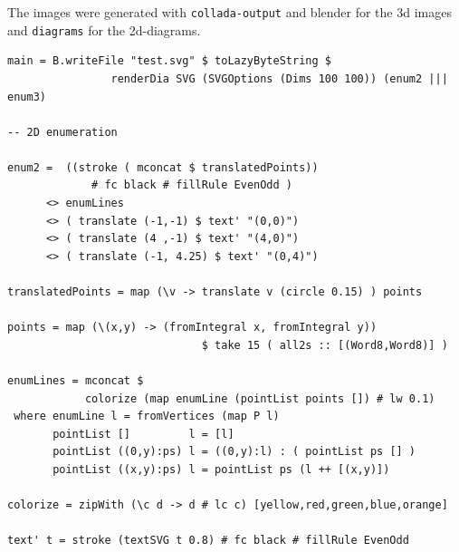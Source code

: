 \documentclass{tmr}
\begin{document}
The images were generated with \verb|collada-output| and blender for the 3d images 
and \verb|diagrams| for the 2d-diagrams.

\begin{verbatim}
main = B.writeFile "test.svg" $ toLazyByteString $
                renderDia SVG (SVGOptions (Dims 100 100)) (enum2 ||| enum3)

-- 2D enumeration

enum2 =  ((stroke ( mconcat $ translatedPoints)) 
             # fc black # fillRule EvenOdd )
      <> enumLines
      <> ( translate (-1,-1) $ text' "(0,0)")
      <> ( translate (4 ,-1) $ text' "(4,0)")
      <> ( translate (-1, 4.25) $ text' "(0,4)")

translatedPoints = map (\v -> translate v (circle 0.15) ) points

points = map (\(x,y) -> (fromIntegral x, fromIntegral y))
                              $ take 15 ( all2s :: [(Word8,Word8)] )

enumLines = mconcat $ 
            colorize (map enumLine (pointList points []) # lw 0.1)
 where enumLine l = fromVertices (map P l)
       pointList []         l = [l]
       pointList ((0,y):ps) l = ((0,y):l) : ( pointList ps [] )
       pointList ((x,y):ps) l = pointList ps (l ++ [(x,y)])

colorize = zipWith (\c d -> d # lc c) [yellow,red,green,blue,orange]

text' t = stroke (textSVG t 0.8) # fc black # fillRule EvenOdd
\end{verbatim}


\end{document}
